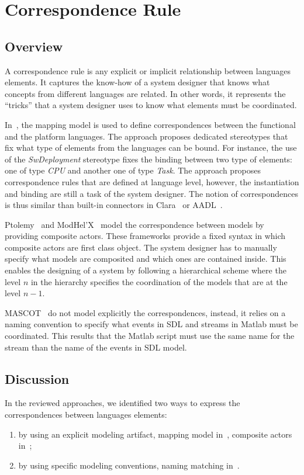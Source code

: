 \section{Correspondence Rule}
	\subsection{Overview}
A correspondence rule is any explicit or implicit relationship between languages elements. It captures the know-how of a system designer that knows what concepts from different languages are related. In other words, it represents the ``tricks'' that a system designer uses to know what elements must be coordinated. %

In~\cite{dinatale}, the mapping model is used to define correspondences between the functional and the platform languages. The approach proposes dedicated stereotypes that fix what type of elements from the languages can be bound. For instance, the use of the \emph{SwDeployment} stereotype fixes the binding between two type of elements: one of type \emph{CPU} and another one of type \emph{Task}. The approach proposes correspondence rules that are defined at language level, however, the instantiation and binding are still a task of the system designer. The notion of correspondences is thus similar than built-in connectors in Clara~\cite{clarabib} or AADL~\cite{aadlbib}. 
		
Ptolemy~\cite{ptoleframebib} and ModHel'X~\cite{modhelxbib} model the correspondence between models by providing composite actors. These frameworks provide a fixed syntax in which composite actors are first class object. The system designer has to manually specify what models are composited and which ones are contained inside. This enables the designing of a system by following a hierarchical scheme where the level $n$ in the hierarchy specifies the coordination of the models that are at the level $n-1$.

MASCOT~\cite{mascotbib} do not model explicitly the correspondences, instead, it relies on a naming convention to specify what events in SDL and streams in Matlab must be coordinated. This results that the Matlab script must use the same name for the stream than the name of the events in SDL model.  

\subsection{Discussion}
In the reviewed approaches, we identified two ways to express the correspondences between languages elements:
\begin{enumerate}
 \item by using an explicit modeling artifact, \eg mapping model in~\cite{dinatale}, composite actors in~\cite{modhelxbib, ptoleframebib}; 	
  \item by using specific modeling conventions, \eg naming matching in~\cite{mascotbib}.
\end{enumerate}
				
